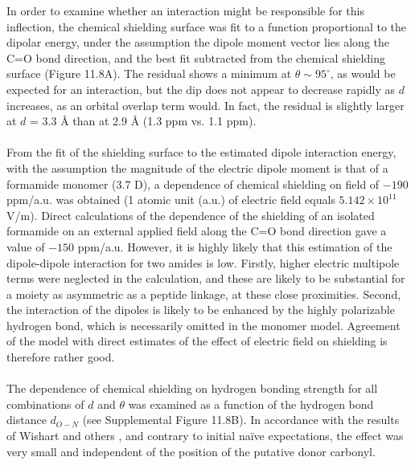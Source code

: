 \begin{doublespace}
In order to examine whether an \npipistar{} interaction might be responsible
for this inflection, the chemical shielding surface was fit to a function
proportional to the dipolar energy, under the assumption the dipole moment
vector lies along the C=O bond direction, and the best fit subtracted from the
chemical shielding surface (Figure 11.8A). The residual shows a
minimum at $\theta \sim 95^\circ$, as would be expected for an \npipistar{}
interaction, but the dip does not appear to decrease rapidly as $d$ increases,
as an orbital overlap term would. In fact, the residual is slightly larger at
$d$ = 3.3 \r{A} than at 2.9 \r{A} (1.3 ppm vs. 1.1 ppm).
\\\\
From the fit of the shielding surface to the estimated dipole interaction
energy, with the assumption the magnitude of the electric dipole moment is
that of a formamide monomer (3.7 D), a dependence of chemical shielding on
field of $-190$ ppm/a.u. was obtained (1 atomic unit (a.u.) of electric field
equals $5.142\times10^{11}$ V/m). Direct calculations of the dependence of the
shielding of an isolated formamide on an external applied field along the C=O
bond direction gave a value of $-150$ ppm/a.u. However, it is highly likely
that this estimation of the dipole-dipole interaction for two amides is low.
Firstly, higher electric multipole terms were neglected in the calculation,
and these are likely to be substantial for a moiety as asymmetric as a peptide
linkage, at these close proximities. Second, the interaction of the dipoles
is likely to be enhanced by the highly polarizable hydrogen bond, which is
necessarily omitted in the monomer model. Agreement of the model with direct
estimates of the effect of electric field on shielding is therefore rather
good.
\\\\
The dependence of chemical shielding on hydrogen bonding strength for all
combinations of $d$ and $\theta$ was examined as a function of the hydrogen
bond distance $d_{O-N}$ (see Supplemental Figure 11.8B). In accordance with
the results of Wishart and others
\cite{cisnetti:cpc2004,neal:jbnmr2003,markwick:jacs2004}, and contrary
to initial na\"{i}ve expectations, the effect was very small and independent of
the position of the putative \npipistar{} donor carbonyl.
\end{doublespace}

